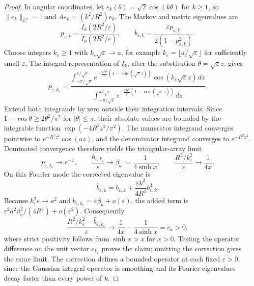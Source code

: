 \documentclass[11pt,a4paper]{article}
\theoremstyle{definition}\newtheorem{definition}[theorem]{Definition}
\theoremstyle{remark}\newtheorem{remark}[theorem]{Remark}
\begin{document}
\begin{proof}
In angular coordinates, let $e_k(\theta)=\sqrt2\cos(k\theta)$ for
$k\ge1$, so $\|e_k\|_{L^2}=1$ and $Ae_k=(k^2/R^2)e_k$.
The Markov and metric eigenvalues are
\[
 p_{\varepsilon,k}=
 \frac{I_k(2R^2/\varepsilon)}{I_0(2R^2/\varepsilon)},
 \qquad
 b_{\varepsilon,k}=
 \frac{\varepsilon p_{\varepsilon,k}}
      {2(1-p_{\varepsilon,k}^2)}.
\]
Choose integers $k_\varepsilon\ge1$ with
$k_\varepsilon\sqrt\varepsilon\to a$, for example
$k_\varepsilon=\lfloor a/\sqrt\varepsilon\rfloor$ for sufficiently
small $\varepsilon$.  The integral representation of $I_k$, after
the substitution $\theta=\sqrt\varepsilon z$, gives
\[
 p_{\varepsilon,k_\varepsilon}
 =\frac{
 \displaystyle\int_{-\pi/\sqrt\varepsilon}^{\pi/\sqrt\varepsilon}
 e^{-\frac{2R^2}{\varepsilon}(1-\cos(\sqrt\varepsilon z))}
 \cos(k_\varepsilon\sqrt\varepsilon z)\,dz}
 {\displaystyle\int_{-\pi/\sqrt\varepsilon}^{\pi/\sqrt\varepsilon}
 e^{-\frac{2R^2}{\varepsilon}(1-\cos(\sqrt\varepsilon z))}\,dz}.
\]
Extend both integrands by zero outside their integration intervals.
Since $1-\cos\theta\ge2\theta^2/\pi^2$ for $|\theta|\le\pi$,
their absolute values are bounded by the integrable function
$\exp(-4R^2z^2/\pi^2)$.  The numerator integrand converges pointwise
to $e^{-R^2z^2}\cos(az)$, and the denominator integrand converges
to $e^{-R^2z^2}$.  Dominated convergence therefore yields the
triangular-array limit
\[
 p_{\varepsilon,k_\varepsilon}\longrightarrow e^{-x},
 \qquad
 \frac{b_{\varepsilon,k_\varepsilon}}{\varepsilon}
   \longrightarrow\beta_a:=\frac1{4\sinh x},
 \qquad
 \frac{R^2/k_\varepsilon^2}{\varepsilon}
   \longrightarrow\frac1{4x}.
\]
On this Fourier mode the corrected eigenvalue is
\[
 \widehat b_{\varepsilon,k}
   =b_{\varepsilon,k}
     +\frac{\varepsilon k^2}{4R^4}b_{\varepsilon,k}^2.
\]
Because $k_\varepsilon^2\varepsilon\to a^2$ and
$b_{\varepsilon,k_\varepsilon}=\varepsilon\beta_a+o(\varepsilon)$,
the added term is
$\varepsilon^2a^2\beta_a^2/(4R^4)+o(\varepsilon^2)$.
Consequently
\[
 \frac{R^2/k_\varepsilon^2-
       \widehat b_{\varepsilon,k_\varepsilon}}{\varepsilon}
 \longrightarrow\frac1{4x}-\frac1{4\sinh x}=c_a>0,
\]
where strict positivity follows from $\sinh x>x$ for $x>0$.
Testing the operator difference on the unit vector
$e_{k_\varepsilon}$ proves the claim; omitting the correction gives
the same limit.  The correction defines a bounded operator at each
fixed $\varepsilon>0$, since the Gaussian integral operator is
smoothing and its Fourier eigenvalues decay faster than every
power of $k$.
\end{proof}
\end{document}

